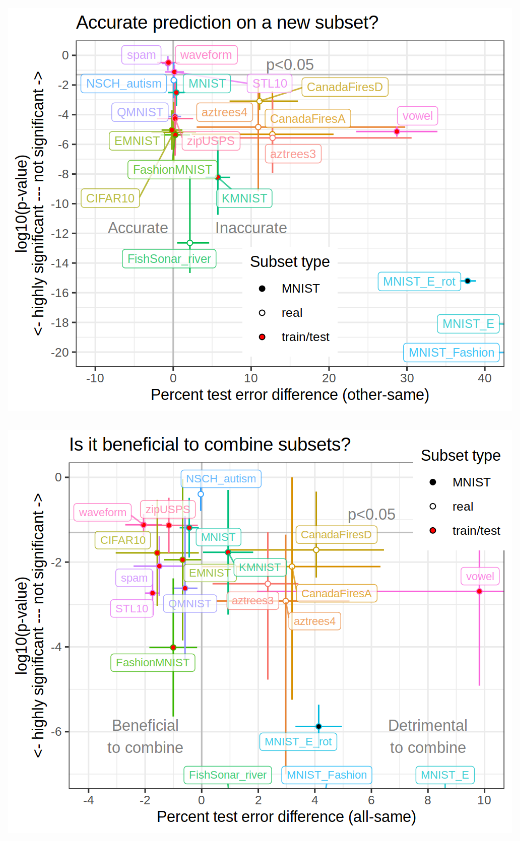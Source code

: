 \documentclass{beamer}
\begin{document}
\begin{frame}
  \includegraphics[height=\textheight]{data_Classif_batchmark_registry_scatter_other_segments.png} 
\end{frame}

\begin{frame}
  \includegraphics[height=\textheight]{data_Classif_batchmark_registry_scatter_all_segments.png}
\end{frame}
 
\end{document}
